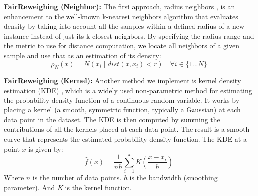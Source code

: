\textbf{FairReweighing (Neighbor):} The first approach, radius neighbors \cite{goldberger2004neighbourhood}, is an enhancement to the well-known k-nearest neighbors algorithm that evaluates density by taking into account all the samples within a defined radius of a new instance instead of just its k closest neighbors. By specifying the radius range and the metric to use for distance computation, we locate all neighbors of a given sample and use that as an estimation of its density:
\begin{equation}
\rho_N(x) = N(x_i \mid dist(x,x_i)<r) \quad \forall i \in \{1...N\}
\end{equation}

\textbf{FairReweighing (Kernel):} Another method we implement is kernel density estimation (KDE) \cite{terrell1992variable}, which is a widely used non-parametric method for estimating the probability density function of a continuous random variable. It works by placing a kernel (a smooth, symmetric function, typically a Gaussian) at each data point in the dataset. The KDE is then computed by summing the contributions of all the kernels placed at each data point. The result is a smooth curve that represents the estimated probability density function. The KDE at a point 
$x$ is given by:
\begin{equation}\label{kde}
\hat{f}(x) = \frac{1}{nh} \sum_{i=1}^n K (\frac{x - x_i}{h})
\end{equation}
Where $n$ is the number of data points. $h$ is the bandwidth (smoothing parameter). And $K$ is the kernel function.


